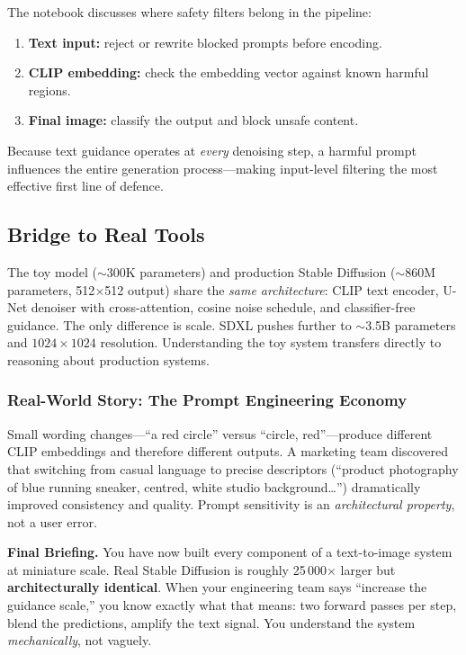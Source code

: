 \documentclass[11pt,a4paper]{article}
\begin{document}
The notebook discusses where safety filters belong in the pipeline:

\begin{enumerate}[nosep]
  \item \textbf{Text input:} reject or rewrite blocked prompts before
        encoding.
  \item \textbf{CLIP embedding:} check the embedding vector against
        known harmful regions.
  \item \textbf{Final image:} classify the output and block unsafe
        content.
\end{enumerate}

Because text guidance operates at \emph{every} denoising step, a harmful
prompt influences the entire generation process---making input-level
filtering the most effective first line of defence.

\subsection{Bridge to Real Tools}

The toy model ($\sim$300K parameters) and production Stable Diffusion
($\sim$860M parameters, 512$\times$512 output) share the \emph{same
architecture}: CLIP text encoder, U-Net denoiser with cross-attention,
cosine noise schedule, and classifier-free guidance.  The only difference
is scale.  SDXL pushes further to $\sim$3.5B parameters and
$1024 \times 1024$ resolution.  Understanding the toy system transfers
directly to reasoning about production systems.

\subsubsection*{Real-World Story: The Prompt Engineering Economy}

Small wording changes---``a red circle'' versus ``circle, red''---produce
different CLIP embeddings and therefore different outputs.  A marketing
team discovered that switching from casual language to precise
descriptors (``product photography of blue running sneaker, centred,
white studio background\ldots'') dramatically improved consistency and
quality.  Prompt sensitivity is an \emph{architectural property}, not a
user error.

\begin{managerbox}
\textbf{Final Briefing.}  You have now built every component of a
text-to-image system at miniature scale.  Real Stable Diffusion is
roughly 25\,000$\times$ larger but \textbf{architecturally identical}.
When your engineering team says ``increase the guidance scale,'' you know
exactly what that means: two forward passes per step, blend the
predictions, amplify the text signal.  You understand the system
\emph{mechanically}, not vaguely.
\end{managerbox}
\end{document}
